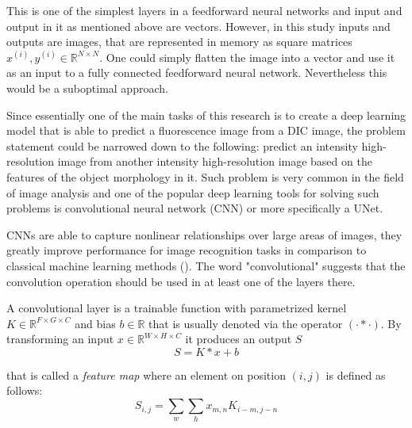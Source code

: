 This is one of the simplest layers in a feedforward neural networks and input and output in it as mentioned above are vectors. However, in this study inputs and outputs are images, that are represented in memory as square matrices $x^{(i)}, y^{(i)} \in \mathbb{R}^{N \times N}$. One could simply flatten the image into a vector and use it as an input to a fully connected feedforward neural network. Nevertheless this would be a suboptimal approach. 

Since essentially one of the main tasks of this research is to create a deep learning model that is able to predict a fluorescence image from a DIC image, the problem statement could be narrowed down to the following: predict an intensity high-resolution image from another intensity high-resolution image based on the features of the object morphology in it. Such problem is very common in the field of image analysis and one of the popular deep learning tools for solving such problems is convolutional neural network (CNN) or more specifically a UNet.

CNNs are able to capture nonlinear relationships over large areas of images, they greatly improve performance for image recognition tasks in comparison to classical machine learning methods (\cite{Ounkomol_2018}). The word "convolutional" suggests that the convolution operation should be used in at least one of the layers there.  

\begin{definition}
	A convolutional layer is a trainable function with parametrized kernel $K \in \mathbb{R}^{F \times G \times C}$ and bias $b \in \mathbb{R}$ that is usually denoted via the operator $(\cdot * \cdot)$. By transforming an input $x \in \mathbb{R}^{W \times H \times C}$ it produces an output $S$
	\begin{equation}
		S = K * x + b
	\end{equation}

	that is called a \textit{feature map} where an element on position $(i, j)$ is defined as follows:
		\begin{equation}
			S_{i, j} = \sum_{w} \sum_{h} x_{m, n}  K_{i - m, j - n}
		\end{equation}
\end{definition}

